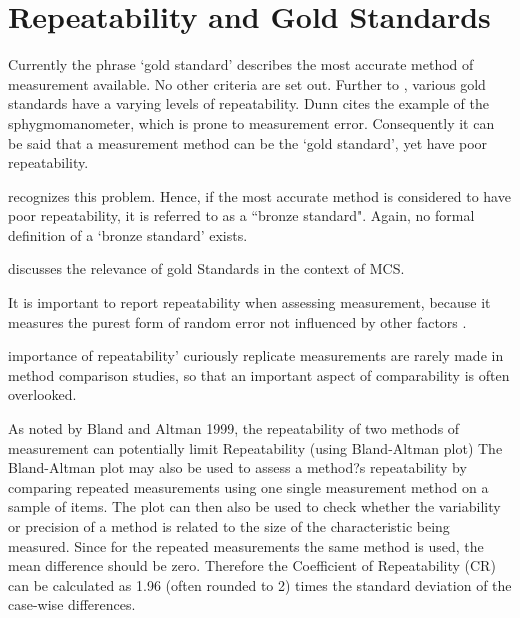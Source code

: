 \documentclass[12pt, a4paper]{report}
\theoremstyle{plain}
\theoremstyle{definition}
\theoremstyle{remark}
\begin{document}
	





		\section{Repeatability and Gold Standards}
		Currently the phrase `gold standard' describes the most accurate method of measurement available. No other criteria are set out. Further to \citet{dunnSEME}, various gold standards have a varying levels of repeatability. Dunn cites the example of the sphygmomanometer, which is prone to measurement error. Consequently it can be said that a measurement method can be the `gold standard', yet have poor repeatability. 
		
		\citet{dunnSEME} recognizes  this problem. Hence, if the most accurate method is considered to have poor repeatability, it is referred to as a ``bronze standard".  Again, no formal definition of a `bronze standard' exists.
		
		

\citet{ARoy2015} discusses the relevance of gold Standards in the context of MCS.


		
	
	It is important to report repeatability when assessing measurement, because it measures the purest form of random error not influenced by other factors \citep{Barnhart}.	
	
	importance of repeatability' curiously replicate measurements are rarely made in method comparison studies, so that an important aspect of comparability is often overlooked.
	

	As noted by Bland and Altman 1999, the repeatability of two methods of measurement can  potentially limit
	Repeatability (using Bland-Altman plot)
	The Bland-Altman plot may also be used to assess a method?s repeatability by comparing repeated measurements using one single measurement method on a sample of items.
	The plot can then also be used to check whether the variability or precision of a method is related to the size of the characteristic being measured.
	Since for the repeated measurements the same method is used, the mean difference should be zero.
	Therefore the Coefficient of Repeatability (CR) can be calculated as 1.96 (often rounded to 2) times the standard deviation of the case-wise differences.
	
\end{document}
